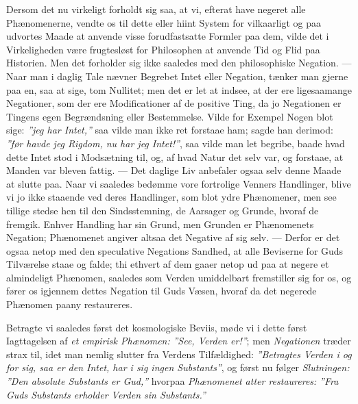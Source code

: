 \documentclass[12pt]{book}
\newcommand{\opage}[1]{\marginnote{\footnotesize\textit{[#1]}}}
\begin{document}
Dersom det nu virkeligt forholdt sig saa, at vi, efterat have negeret alle
Phænomenerne, vendte os til dette eller hiint System for vilkaarligt og paa
udvortes Maade at anvende visse forudfastsatte Formler paa dem, vilde det i
Virkeligheden være frugtesløst for Philosophen at anvende Tid og Flid paa
Historien. Men det forholder sig ikke saaledes med den philosophiske Negation.
--- Naar man i daglig Tale nævner Begrebet Intet eller Negation, tænker man
gjerne paa en, saa at sige, tom Nullitet; men det er let at indsee, at der ere
ligesaamange Negationer, som der ere Modificationer af de positive Ting, da jo
Negationen er Tingens egen Begrændsning eller Bestemmelse. Vilde for Exempel
Nogen blot sige:%
\opage{21} \emph{”jeg har Intet,”} saa vilde man ikke ret forstaae ham; sagde han derimod:
\emph{”før havde jeg Rigdom, nu har jeg Intet!”}, saa vilde man let begribe,
baade hvad dette Intet stod i Modsætning til, og, af hvad Natur det selv var, og
forstaae, at Manden var bleven fattig. --- Det daglige Liv anbefaler ogsaa selv
denne Maade at slutte paa. Naar vi saaledes bedømme vore fortrolige Venners
Handlinger, blive vi jo ikke staaende ved deres Handlinger, som blot ydre
Phænomener, men see tillige stedse hen til den Sindsstemning, de Aarsager og
Grunde, hvoraf de fremgik. Enhver Handling har sin Grund, men Grunden er
Phænomenets Negation; Phænomenet angiver altsaa det Negative af sig selv. ---
Derfor er det ogsaa netop med den speculative Negations Sandhed, at alle
Beviserne for Guds Tilværelse staae og falde; thi ethvert af dem gaaer netop ud
paa at negere et almindeligt Phænomen, saaledes som Verden umiddelbart
fremstiller sig for os, og fører os igjennem dettes Negation til Guds Væsen,
hvoraf da det negerede Phænomen paany restaureres.

Betragte vi saaledes først det kosmologiske Beviis, møde vi i dette først
Iagttagelsen af \emph{et empirisk Phænomen:} \emph{”See, Verden er!”}; men
\emph{Negationen} træder strax til, idet man nemlig slutter fra Verdens
Tilfældighed: \emph{”Betragtes Verden i og for sig, saa er den Intet, har i sig
ingen Substants”}, og først nu følger \emph{Slutningen:} \emph{”Den absolute
Substants er Gud,”} hvorpaa \emph{Phænomenet atter restaureres:} \emph{”Fra Guds
Substants erholder Verden sin Substants.”}
\end{document}
